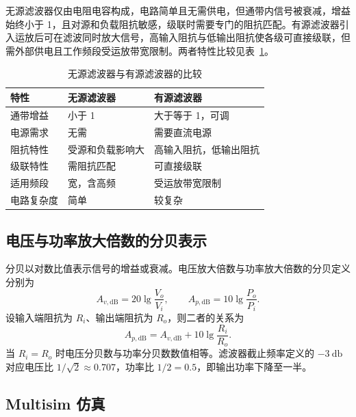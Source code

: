 无源滤波器仅由电阻电容构成，电路简单且无需供电，但通带内信号被衰减，增益始终小于 1，且对源和负载阻抗敏感，级联时需要专门的阻抗匹配。有源滤波器引入运放后可在滤波同时放大信号，高输入阻抗与低输出阻抗使各级可直接级联，但需外部供电且工作频段受运放带宽限制。两者特性比较见表~\ref{e8-tab:filter-comparison}。

\begin{table}[H]
    \centering
    \caption{无源滤波器与有源滤波器的比较}
    \label{e8-tab:filter-comparison}
    \begin{tabular}{lll}
        \toprule
        特性 & 无源滤波器 & 有源滤波器 \\
        \midrule
        通带增益   & 小于 1           & 大于等于 1，可调 \\
        电源需求   & 无需             & 需要直流电源 \\
        阻抗特性   & 受源和负载影响大 & 高输入阻抗，低输出阻抗 \\
        级联特性   & 需阻抗匹配       & 可直接级联 \\
        适用频段   & 宽，含高频       & 受运放带宽限制 \\
        电路复杂度 & 简单             & 较复杂 \\
        \bottomrule
    \end{tabular}
\end{table}

\subsection{电压与功率放大倍数的分贝表示}

分贝以对数比值表示信号的增益或衰减。电压放大倍数与功率放大倍数的分贝定义分别为
\begin{equation}
    A_{v,\mathrm{dB}} = 20\lg\frac{V_o}{V_i},\qquad
    A_{p,\mathrm{dB}} = 10\lg\frac{P_o}{P_i}.
    \label{e8-eq:db-def}
\end{equation}
设输入端阻抗为 $R_i$、输出端阻抗为 $R_o$，则二者的关系为
\begin{equation}
    A_{p,\mathrm{dB}} = A_{v,\mathrm{dB}} + 10\lg\frac{R_i}{R_o}.
    \label{e8-eq:db-relation}
\end{equation}
当 $R_i = R_o$ 时电压分贝数与功率分贝数数值相等。滤波器截止频率定义的 $-\SI{3}{\decibel}$ 对应电压比 $1/\sqrt{2}\approx 0.707$，功率比 $1/2 = 0.5$，即输出功率下降至一半。

\subsection{Multisim 仿真}

